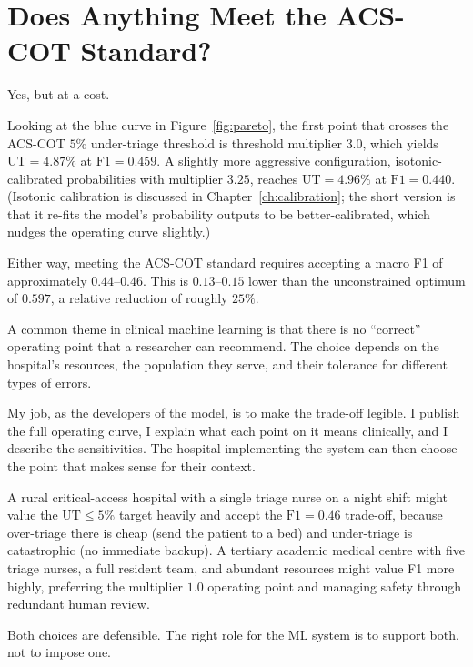 \section{Does Anything Meet the ACS-COT Standard?}

Yes, but at a cost.

Looking at the blue curve in Figure~\ref{fig:pareto}, the first point that crosses the ACS-COT $5\%$ under-triage threshold is threshold multiplier $3.0$, which yields $\text{UT} = 4.87\%$ at $\text{F1} = 0.459$. A slightly more aggressive configuration, isotonic-calibrated probabilities with multiplier $3.25$, reaches $\text{UT} = 4.96\%$ at $\text{F1} = 0.440$. (Isotonic calibration is discussed in Chapter~\ref{ch:calibration}; the short version is that it re-fits the model's probability outputs to be better-calibrated, which nudges the operating curve slightly.)

Either way, meeting the ACS-COT standard requires accepting a macro F1 of approximately $0.44$--$0.46$. This is $0.13$--$0.15$ lower than the unconstrained optimum of $0.597$, a relative reduction of roughly $25\%$.

\begin{notebox}
A common theme in clinical machine learning is that there is no ``correct'' operating point that a researcher can recommend. The choice depends on the hospital's resources, the population they serve, and their tolerance for different types of errors.

My job, as the developers of the model, is to make the trade-off legible. I publish the full operating curve, I explain what each point on it means clinically, and I describe the sensitivities. The hospital implementing the system can then choose the point that makes sense for their context.

A rural critical-access hospital with a single triage nurse on a night shift might value the $\text{UT} \leq 5\%$ target heavily and accept the $\text{F1} = 0.46$ trade-off, because over-triage there is cheap (send the patient to a bed) and under-triage is catastrophic (no immediate backup). A tertiary academic medical centre with five triage nurses, a full resident team, and abundant resources might value F1 more highly, preferring the multiplier $1.0$ operating point and managing safety through redundant human review.

Both choices are defensible. The right role for the ML system is to support both, not to impose one.
\end{notebox}

